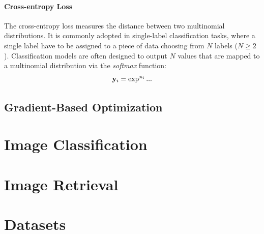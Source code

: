 \paragraph{Cross-entropy Loss}
The cross-entropy loss measures the distance between two multinomial distributions.
It is commonly adopted in single-label classification tasks, where a single label have to be assigned to a piece of data choosing from $N$ labels ($N \geq 2$).
Classification models are often designed to output $N$ values that are mapped to a multinomial distribution via the \emph{softmax} function:
\begin{equation}
    \mathbf{y}_i = \exp^{\mathbf{x}_i} ...
\end{equation}



\subsection{Gradient-Based Optimization}
\label{subsec:back:optim}


\section{Image Classification}
\label{sec:back:image-classification}




\section{Image Retrieval}
\label{sec:back:image-retrieval}


\section{Datasets}
\label{sec:back:datasets}
